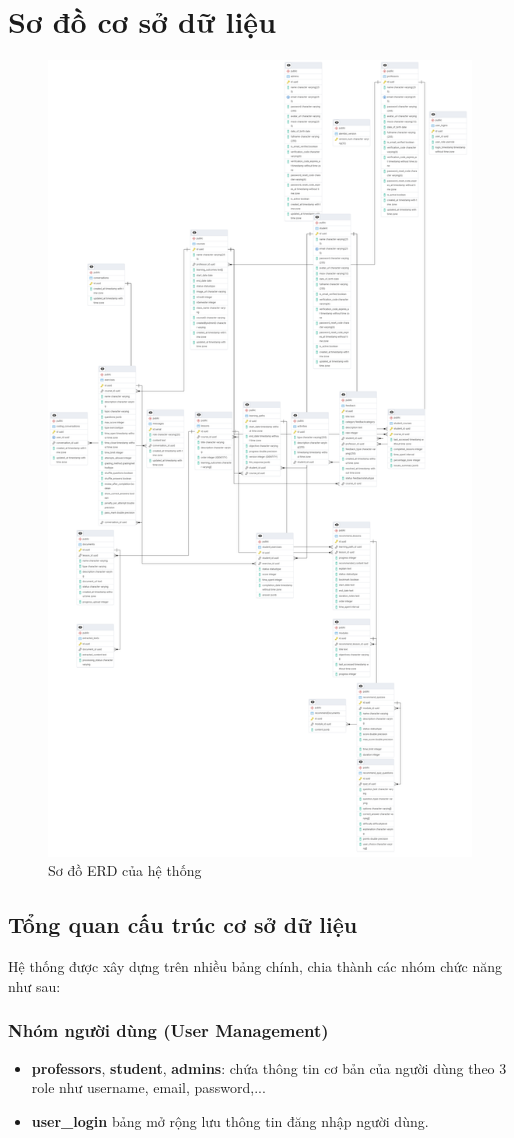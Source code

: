 \section{Sơ đồ cơ sở dữ liệu}
\begin{figure}[H]
    \centering
    \includegraphics[width=0.6\linewidth]{images/ERD.png}
    \caption{Sơ đồ ERD của hệ thống}
    \label{fig:enter-label}
\end{figure}

\subsection{Tổng quan cấu trúc cơ sở dữ liệu}
Hệ thống được xây dựng trên nhiều bảng chính, chia thành các nhóm chức năng như sau:

\subsubsection{Nhóm người dùng (User Management)}
\begin{itemize}
    \item \textbf{professors}, \textbf{student}, \textbf{admins}: chứa thông tin cơ bản của người dùng theo 3 role như username, email, password,...
    \item \textbf{user\_login}\: bảng mở rộng lưu thông tin đăng nhập người dùng.
\end{itemize}

